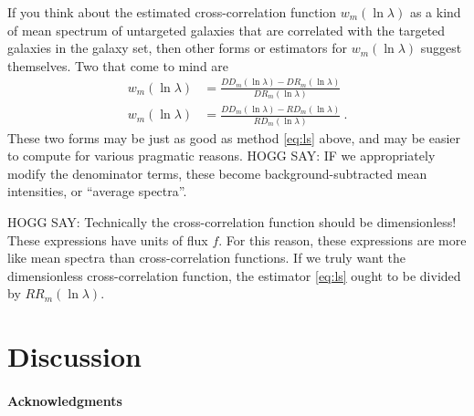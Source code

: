 \documentclass{article}
\begin{document}
If you think about the estimated cross-correlation function $w_m(\ln\lambda)$ as a kind of mean spectrum of untargeted galaxies that are correlated with the targeted galaxies in the galaxy set, then other forms or estimators for $w_m(\ln\lambda)$ suggest themselves.
Two that come to mind are
\begin{align}
    w_m(\ln\lambda) &= \frac{DD_m(\ln\lambda) - DR_m(\ln\lambda)}{DR_m(\ln\lambda)} \\
    w_m(\ln\lambda) &= \frac{DD_m(\ln\lambda) - RD_m(\ln\lambda)}{RD_m(\ln\lambda)} ~.
\end{align}
These two forms may be just as good as method \eqref{eq:ls} above, and may be easier to compute for various pragmatic reasons.
HOGG SAY: IF we appropriately modify the denominator terms, these become background-subtracted mean intensities, or ``average spectra''.

HOGG SAY: Technically the cross-correlation function should be dimensionless!
These expressions have units of flux $f$.
For this reason, these expressions are more like mean spectra than cross-correlation functions.
If we truly want the dimensionless cross-correlation function, the estimator \eqref{eq:ls} ought to be divided by $RR_m(\ln\lambda)$.

\section{Discussion}\label{sec:discussion}

\paragraph{Acknowledgments}


\end{document}
